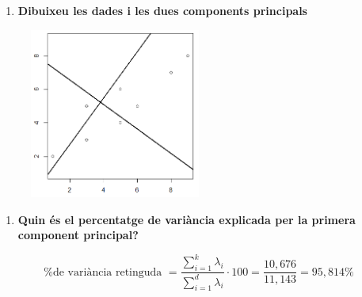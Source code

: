 \documentclass[a4paper]{article}
\begin{document}
\begin{enumerate}[resume]
    \item \textbf{Dibuixeu les dades i les dues components principals}
\end{enumerate}

\begin{figure}[H]
    \centering
    \includegraphics[width=0.5\textwidth]{Rplot}
\end{figure}

\begin{enumerate}[resume]
    \item \textbf{Quin és el percentatge de variància explicada per la primera component principal?}
\end{enumerate}

$$ 
\%\text{de variància retinguda } = \frac{\sum_{i=1}^k \lambda_i}{\sum_{i=1}^d \lambda_i}·100 =
\frac{10,676}{11,143} = 95,814 \%
$$
\end{document}
